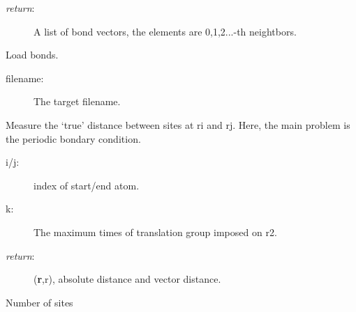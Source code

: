 \documentclass[letterpaper,10pt,oneside,openany]{sphinxmanual}
\begin{document}
\begin{fulllineitems}
\begin{fulllineitems}
\begin{description}
\item[{\emph{return}:}] \leavevmode
A list of bond vectors, the elements are 0,1,2...-th neightbors.

\end{description}

\end{fulllineitems}


\begin{fulllineitems}
\label{index:lattice.structure.Structure.load_bonds}
Load bonds.
\begin{description}
\item[{filename:}] \leavevmode
The target filename.

\end{description}

\end{fulllineitems}


\begin{fulllineitems}
\label{index:lattice.structure.Structure.measure}
Measure the `true' distance between sites at ri and rj. 
Here, the main problem is the periodic bondary condition.
\begin{description}
\item[{i/j: }] \leavevmode
index of start/end atom.

\item[{k:}] \leavevmode
The maximum times of translation group imposed on r2.

\item[{\emph{return}:}] \leavevmode
({\color{red}\bfseries{}\textbar{}r\textbar{}},r), absolute distance and vector distance.

\end{description}

\end{fulllineitems}


\begin{fulllineitems}
\label{index:lattice.structure.Structure.nsite}
Number of sites

\end{fulllineitems}


\end{fulllineitems}
\end{document}
